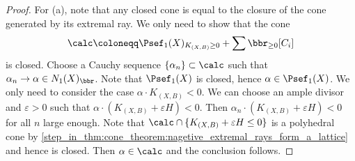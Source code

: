 \begin{proof}
        For (a), note that any closed cone is equal to the closure of the cone generated by its extremal ray.
        We only need to show that the cone
        \[ \calc\coloneqq \Psef_1(X)_{K_{(X,B)} \geq 0} + \sum \bbr_{\geq 0}[C_i] \]
        is closed.
        Choose a Cauchy sequence \(\{\alpha_n\} \subset \calc\) such that \(\alpha_n \to \alpha \in N_1(X)_\bbr\).
        Note that \(\Psef_1(X)\) is closed, hence \(\alpha \in \Psef_1(X)\).
        We only need to consider the case \(\alpha \cdot K_{(X,B)} < 0\).
        We can choose an ample divisor and \(\varepsilon > 0\) such that \(\alpha \cdot (K_{(X,B)}+\varepsilon H) < 0\).
        Then \(\alpha_n \cdot (K_{(X,B)}+\varepsilon H) < 0\) for all \(n\) large enough.
        Note that \(\calc \cap \{K_{(X,B)}+\varepsilon H \leq 0\}\) is a polyhedral cone by \cref{step_in_thm:cone_theorem:nagetive_extremal_rays_form_a_lattice} and hence is closed.
        Then \(\alpha \in \calc\) and the conclusion follows.
    \end{proof}


